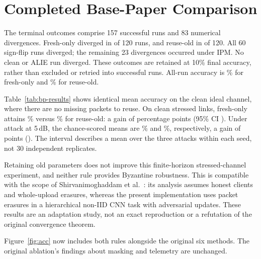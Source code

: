\section{Completed Base-Paper Comparison}
\label{sec:bp-results}
The \BpNumRuns{} terminal outcomes comprise 157 successful runs and 83 numerical
divergences. Fresh-only diverged in \BpDivFresh{} of 120 runs, and reuse-old in
\BpDivReuse{} of 120. All 60 sign-flip runs diverged; the remaining 23 divergences
occurred under IPM. No clean or ALIE run diverged. These outcomes are retained at
10\% final accuracy, rather than excluded or retried into successful runs.
All-run accuracy is \BpAllFresh\% for fresh-only and \BpAllReuse\% for reuse-old.

\begin{table}[ht]
\centering
\caption{Separate base-paper follow-up: ten paired seeds per cell. Final accuracy
includes numerical divergences at chance (10\%). Intervals are exploratory paired
seed-bootstrap intervals, with no multiplicity adjustment.}
\label{tab:bp-results}
\small

\end{table}

Table~\ref{tab:bp-results} shows identical mean accuracy on the clean ideal channel,
where there are no missing packets to reuse. On clean stressed links, fresh-only
attains \BpCleanStressFresh\% versus \BpCleanStressReuse\% for reuse-old: a gain of
\BpCleanGain{} percentage points (95\% CI \ci{\BpCleanLo}{\BpCleanHi}). Under attack
at 5\,dB, the chance-scored means are \BpAttackStressFresh\% and
\BpAttackStressReuse\%, respectively, a gain of \BpAttackGain{} points
(\ci{\BpAttackLo}{\BpAttackHi}). The interval describes a mean over the three
attacks within each seed, not 30 independent replicates.

Retaining old parameters does not improve this finite-horizon stressed-channel
experiment, and neither rule provides Byzantine robustness. This is compatible with
the scope of Shirvanimoghaddam et al.~\cite{shirvanimoghaddam2022erroneous}: its analysis assumes honest
clients and whole-upload erasures, whereas the present implementation uses packet
erasures in a hierarchical non-IID CNN task with adversarial updates. These results
are an adaptation study, not an exact reproduction or a refutation of the original
convergence theorem.

Figure~\ref{fig:acc} now includes both rules alongside the original six methods.
The original ablation's findings about masking and telemetry are unchanged.

